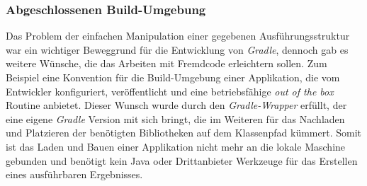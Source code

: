 		\subsubsection{Abgeschlossenen Build-Umgebung} %
		Das Problem der einfachen Manipulation einer gegebenen Ausführungsstruktur war ein wichtiger Beweggrund für die Entwicklung von \textit{Gradle}, dennoch gab es weitere Wünsche, die das Arbeiten mit Fremdcode erleichtern sollen. Zum Beispiel eine Konvention für die Build-Umgebung einer Applikation, die vom Entwickler konfiguriert, veröffentlicht und eine betriebsfähige \textit{out of the box} Routine anbietet. Dieser Wunsch wurde durch den \textit{Gradle-Wrapper} erfüllt, der eine eigene \textit{Gradle} Version mit sich bringt, die im Weiteren für das Nachladen und Platzieren der benötigten Bibliotheken auf dem Klassenpfad kümmert. Somit ist das Laden und Bauen einer Applikation nicht mehr an die lokale Maschine gebunden und benötigt kein Java oder Drittanbieter Werkzeuge für das Erstellen eines ausführbaren Ergebnisses. 

